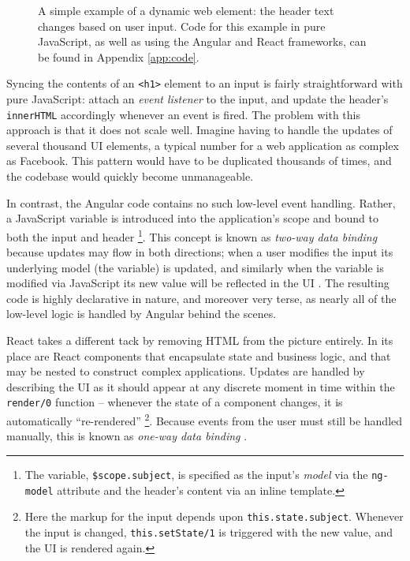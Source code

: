 \documentclass[12pt,letterpaper]{article}
\begin{document}
\begin{SCfigure}[][h]
	\centering
	\caption{A simple example of a dynamic web element: the header text changes based on user input. Code for this example in pure JavaScript, as well as using the Angular and React frameworks, can be found in Appendix \ref{app:code}.}
	\label{fig:Example}
\end{SCfigure}

Syncing the contents of an \texttt{<h1>} element to an input is fairly straightforward with pure JavaScript: attach an \emph{event listener} to the input, and update the header's \texttt{innerHTML} accordingly whenever an event is fired. The problem with this approach is that it does not scale well. Imagine having to handle the updates of several thousand UI elements, a typical number for a web application as complex as Facebook. This pattern would have to be duplicated thousands of times, and the codebase would quickly become unmanageable.

In contrast, the Angular code contains no such low-level event handling. Rather, a JavaScript variable is introduced into the application's scope and bound to both the input and header \footnote{The variable, \texttt{\$scope.subject}, is specified as the input's \emph{model} via the \texttt{ng-model} attribute and the header's content via an inline template.}. This concept is known as \emph{two-way data binding} because updates may flow in both directions; when a user modifies the input its underlying model (the variable) is updated, and similarly when the variable is modified via JavaScript its new value will be reflected in the UI \cite{Angular:Docs}. The resulting code is highly declarative in nature, and moreover very terse, as nearly all of the low-level logic is handled by Angular behind the scenes.

React takes a different tack by removing HTML from the picture entirely. In its place are React components that encapsulate state and business logic, and that may be nested to construct complex applications. Updates are handled by describing the UI as it should appear at any discrete moment in time within the \texttt{render/0} function -- whenever the state of a component changes, it is automatically ``re-rendered'' \footnote{Here the markup for the input depends upon \texttt{this.state.subject}. Whenever the input is changed, \texttt{this.setState/1} is triggered with the new value, and the UI is rendered again.}. Because events from the user must still be handled manually, this is known as \emph{one-way data binding} \cite{Hunt:2014}.
\end{document}
